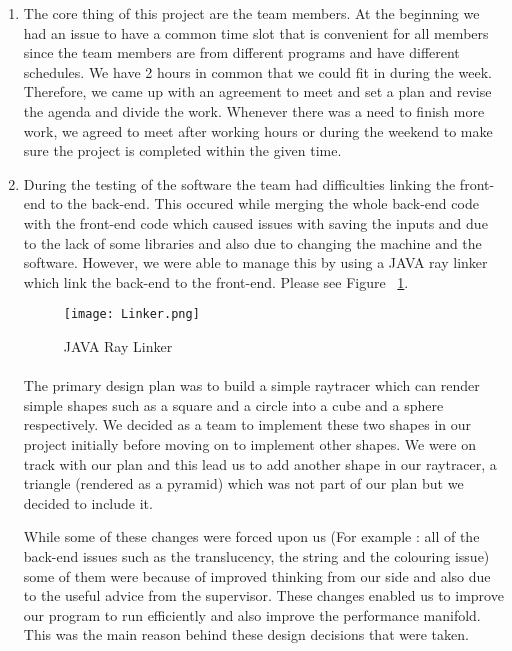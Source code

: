 \documentclass{article}
\begin{document}
\begin{enumerate}
\item The core thing of this project are the team members. At the beginning we had an issue to have a common time slot that is convenient for all members since the team members are from different programs and have different schedules. We have 2 hours in common that we could fit in during the week. Therefore, we came up with an agreement to meet and set a plan and revise the agenda and divide the work. Whenever there was a need to finish more work, we agreed to meet after working hours or during the weekend to make sure the project is completed within the given time.  

\item During the testing of the software the team had difficulties linking the front-end to the back-end. This occured while merging the whole back-end code with the front-end code which caused issues with saving the inputs and due to the lack of some libraries and also due to changing the machine and the software. However, we were able to manage this by using a JAVA ray linker which link the back-end to the front-end. Please see Figure ~\ref{point8}. 

\begin{figure}[!H]
\centering
\texttt{[image: Linker.png]}
\caption{JAVA Ray Linker \label{point8}}
\end{figure}

\paragraph{} The primary design plan was to build a simple raytracer which can render simple shapes such as a square and a circle into a cube and a sphere respectively. We decided as a team to implement these two shapes in our project initially before moving on to implement other shapes. We were on track with our plan and this lead us to add another shape in our raytracer, a triangle (rendered as a pyramid) which was not part of our plan but we decided to include it. 

While some of these changes were forced upon us (For example : all of the back-end issues such as the translucency, the string and the colouring issue) some of them were because of improved thinking from our side and also due to the useful advice from the supervisor. These changes enabled us to improve our program to run efficiently and also improve the performance manifold. This was the main reason behind these design decisions that were taken. 


\end{enumerate}
\end{document}
